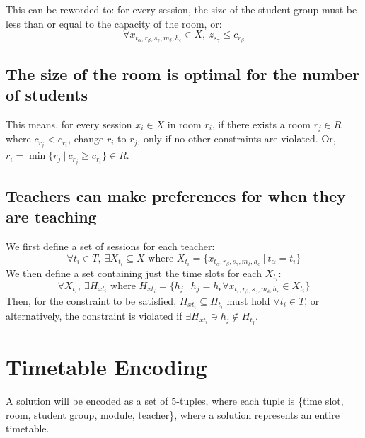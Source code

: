 \documentclass[a4paper, 12pt]{report}
\begin{document}
This can be reworded to: for every session, the size of the student group must 
be less than or equal to the capacity of the room, or:
\begin{equation*}
	\forall x_{t_{\alpha},r_{\beta},s_{\gamma},m_{\delta},h_{\epsilon}} \in X, 
	\: z_{s_{\gamma}} \leq c_{r_{\beta}}
\end{equation*}

\subsection{The size of the room is optimal for the number of students}

This means, for every session \( x_i \in X \) in room \( r_i \), if there 
exists a room \( r_j \in R \) where \( c_{r_j} < c_{r_i} \), change \( 
r_i \) to \( r_j \), only if no other constraints are violated. Or, \( r_i = 
\min \{ r_j \: | \: c_{r_j} \geq c_{r_i} \} \in R \).

\subsection{Teachers can make preferences for when they are teaching}

We first define a set of sessions for each teacher:
\begin{equation*}
	\forall t_i \in T, \: \exists X_{t_i} \subseteq X \text{ where } X_{t_i} = 
	\{ x_{t_{\alpha},r_{\beta},s_{\gamma},m_{\delta},h_{\epsilon}} \: | \: 
	t_{\alpha} = t_i\}
\end{equation*}
We then define a set containing just the time slots for each \( X_{t_i} \):
\begin{equation*}
	\forall X_{t_i}, \: \exists H_{xt_i} \text{ where } H_{xt_i} = \{ h_j \: | 
	\: h_j = h_{\epsilon} \forall x_{t_i,r_{\beta},s_{\gamma},m_{\delta},
	h_{\epsilon}} \in X_{t_i}\}
\end{equation*}
Then, for the constraint to be satisfied, \( H_{xt_i} \subseteq H_{t_i} \) must
hold \( \forall t_i \in T \), or alternatively, the constraint is violated if
\( \exists H_{xt_i} \ni h_j \notin H_{t_j} \).

\section{Timetable Encoding}

A solution will be encoded as a set of 5-tuples, where each tuple is 
\{time slot, room, student group, module, teacher\}, where a solution represents
an entire timetable.
\end{document}
